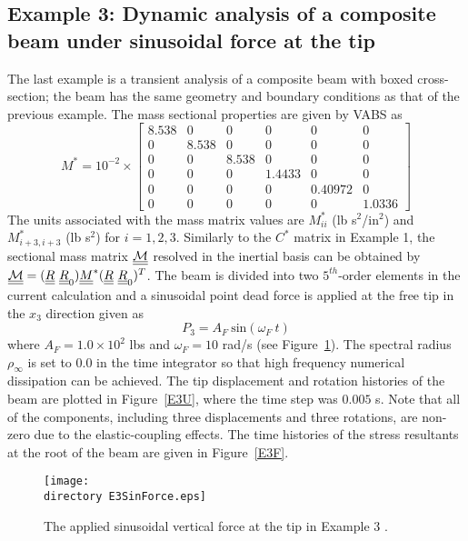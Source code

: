 \subsection{Example 3: Dynamic analysis of a composite beam under sinusoidal force at the tip}

The last example is a transient analysis of a composite beam with boxed
cross-section; the beam has the same
geometry and boundary conditions as that of the previous example. The mass
sectional properties are given by VABS \cite{Yu-etal:2002,Wang-Yu:2012} as
\begin{equation}
    \label{E3Mass}
    M^* = 10^{-2} \times \begin{bmatrix}
	8.538 & 0     & 0     & 0      & 0      & 0      \\
	0       & 8.538 & 0     & 0      & 0      & 0      \\
	0       & 0     & 8.538 & 0      & 0      & 0      \\
	0       & 0     & 0     & 1.4433  & 0  & 0 \\
	0       & 0     & 0     & 0  & 0.40972  &0 \\
	0       & 0     & 0     & 0 & 0 & 1.0336
\end{bmatrix}    
\end{equation}
The units associated with the mass matrix values are $M_{ii}^*$ (lb s$^2$/in$^2$) and $M_{i+3,i+3}^*$ (lb s$^2$) for $i = 1,2,3$. Similarly to the $C^*$ matrix in Example 1, the sectional mass matrix $\underline{\underline{\mathcal{M}}}$ resolved in the inertial basis can be obtained by $\underline{\underline{\mathcal{M}}} = (\underline{\underline{R}}~\underline{\underline{R}}_0) \underline{\underline{M}}^*(\underline{\underline{R}}~\underline{\underline{R}}_0)^T$. The beam is divided into two $5^{th}$-order elements in the current calculation and a sinusoidal point dead force is applied at the free tip in the $x_3$ direction given as
\begin{equation}
    \label{E3AppliedForce}
    P_3 = A_F~\text{sin}(\omega_F~t)
\end{equation}
where $A_F = 1.0 \times 10^2$ lbs and $\omega_F = 10$ rad/s (see
Figure~\ref{E3SinForce}). 
The spectral radius $\rho_\infty$ is set to $0.0$ in the time integrator so that high frequency numerical dissipation can be achieved. The tip displacement and rotation histories of the beam are plotted in
Figure~\ref{E3U}, where the time step was $0.005$ s. Note that all of the components, including three displacements and three rotations, are non-zero due to the elastic-coupling effects. The time histories of the stress resultants at the root of the beam are given in Figure~\ref{E3F}.
\begin{figure}
    \centering
    \texttt{[image: \\directory E3SinForce.eps]}
    \caption{The applied sinusoidal vertical force at the tip in Example 3 .}
    \label{E3SinForce}
\end{figure}

